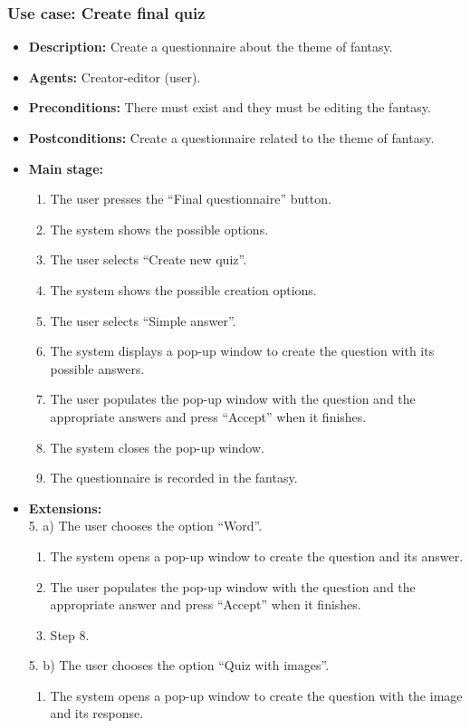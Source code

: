 \subsubsection{Use case: Create final quiz}
\begin{itemize}
	\item \textbf{Description:} Create a questionnaire about the theme of fantasy.
	\item \textbf{Agents:} Creator-editor (user).
	\item \textbf{Preconditions:} There must exist and they must be editing the fantasy.
	\item \textbf{Postconditions:} Create a questionnaire related to the theme of fantasy.
	\item \textbf{Main stage:}
	\begin{enumerate}
		\item The user presses the ``Final questionnaire'' button.
		\item The system shows the possible options.
		\item The user selects ``Create new quiz''.
		\item The system shows the possible creation options.
		\item The user selects ``Simple answer''.
		\item The system displays a pop-up window to create the question with its possible answers.
		\item The user populates the pop-up window with the question and the appropriate answers and press ``Accept'' when it finishes.
		\item The system closes the pop-up window.
		\item The questionnaire is recorded in the fantasy.
	\end{enumerate}
	\item \textbf{Extensions:} \\5. a) The user chooses the option ``Word''.
	\begin{enumerate}
		\item The system opens a pop-up window to create the question and its answer.
		\item The user populates the pop-up window with the question and the appropriate answer and press ``Accept'' when it finishes.
		\item Step 8.
	\end{enumerate}
	5. b) The user chooses the option ``Quiz with images''.
	\begin{enumerate}
		\item The system opens a pop-up window to create the question with the image and its response.

\end{enumerate}
\end{itemize}

